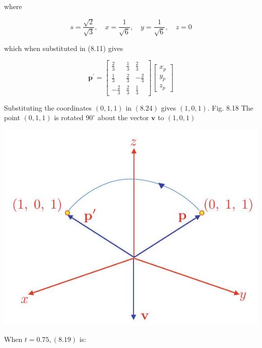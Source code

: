 \documentclass[10pt]{article}
\begin{document}
where

$$
s=\frac{\sqrt{2}}{\sqrt{3}}, \quad x=\frac{1}{\sqrt{6}}, \quad y=\frac{1}{\sqrt{6}}, \quad z=0
$$

which when substituted in (8.11) gives

$$
\mathbf{p}^{\prime}=\left[\begin{array}{rrr}
\frac{2}{3} & \frac{1}{3} & \frac{2}{3} \\
\frac{1}{3} & \frac{2}{3} & -\frac{2}{3} \\
-\frac{2}{3} & \frac{2}{3} & \frac{1}{3}
\end{array}\right]\left[\begin{array}{l}
x_{p} \\
y_{p} \\
z_{p}
\end{array}\right]
$$

Substituting the coordinates $(0,1,1)$ in $(8.24)$ gives $(1,0,1)$. Fig. 8.18 The point $(0,1,1)$ is rotated $90^{\circ}$ about the vector $\mathbf{v}$ to $(1,0,1)$

\begin{center}
\includegraphics[max width=\textwidth]{2023_04_20_41f1ceac5a31dc7d1b59g-171}
\end{center}

When $t=0.75,(8.19)$ is:
\end{document}
